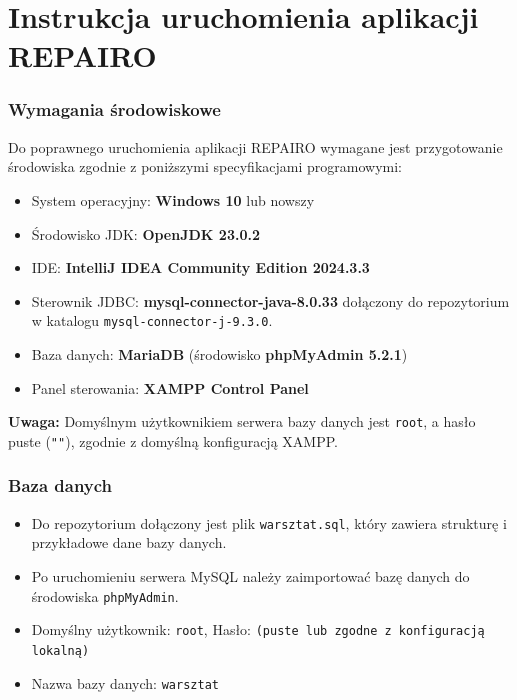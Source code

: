 \chapter{Instrukcja uruchomienia aplikacji REPAIRO}
\label{cha:instrukcja_uruchomienia}

\subsection{Wymagania środowiskowe}

Do poprawnego uruchomienia aplikacji REPAIRO wymagane jest przygotowanie środowiska zgodnie z poniższymi specyfikacjami programowymi:

\begin{itemize}
    \item System operacyjny: \textbf{Windows 10} lub nowszy
    \item Środowisko JDK: \textbf{OpenJDK 23.0.2}
    \item IDE: \textbf{IntelliJ IDEA Community Edition 2024.3.3}
    \item Sterownik JDBC: \textbf{mysql-connector-java-8.0.33} dołączony do repozytorium w katalogu \texttt{mysql-connector-j-9.3.0}.
    \item Baza danych: \textbf{MariaDB} (środowisko \textbf{phpMyAdmin 5.2.1})
    \item Panel sterowania: \textbf{XAMPP Control Panel}
\end{itemize}

\noindent
\textbf{Uwaga:} Domyślnym użytkownikiem serwera bazy danych jest \texttt{root}, a hasło puste (\texttt{""}), zgodnie z domyślną konfiguracją XAMPP.

\subsection{Baza danych}

\begin{itemize}
    \item Do repozytorium dołączony jest plik \texttt{warsztat.sql}, który zawiera strukturę i przykładowe dane bazy danych.
    \item Po uruchomieniu serwera MySQL należy zaimportować bazę danych do środowiska \texttt{phpMyAdmin}.
    \item Domyślny użytkownik: \texttt{root}, Hasło: \texttt{(puste lub zgodne z konfiguracją lokalną)}
    \item Nazwa bazy danych: \texttt{warsztat}
\end{itemize}

